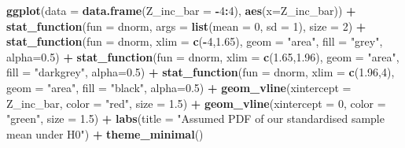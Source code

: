 \documentclass[]{article}
\newenvironment{Shaded}{\begin{snugshade}}{\end{snugshade}}
\newcommand{\KeywordTok}[1]{\textcolor[rgb]{0.13,0.29,0.53}{\textbf{#1}}}
\newcommand{\DataTypeTok}[1]{\textcolor[rgb]{0.13,0.29,0.53}{#1}}
\newcommand{\DecValTok}[1]{\textcolor[rgb]{0.00,0.00,0.81}{#1}}
\newcommand{\FloatTok}[1]{\textcolor[rgb]{0.00,0.00,0.81}{#1}}
\newcommand{\StringTok}[1]{\textcolor[rgb]{0.31,0.60,0.02}{#1}}
\newcommand{\OperatorTok}[1]{\textcolor[rgb]{0.81,0.36,0.00}{\textbf{#1}}}
\newcommand{\NormalTok}[1]{#1}
\begin{document}
\begin{Shaded}
\begin{Highlighting}[]
\KeywordTok{ggplot}\NormalTok{(}\DataTypeTok{data =}  \KeywordTok{data.frame}\NormalTok{(}\DataTypeTok{Z_inc_bar =} \OperatorTok{-}\DecValTok{4}\OperatorTok{:}\DecValTok{4}\NormalTok{), }\KeywordTok{aes}\NormalTok{(}\DataTypeTok{x=}\NormalTok{Z_inc_bar)) }\OperatorTok{+}
\StringTok{  }\KeywordTok{stat_function}\NormalTok{(}\DataTypeTok{fun =}\NormalTok{ dnorm, }\DataTypeTok{args =} \KeywordTok{list}\NormalTok{(}\DataTypeTok{mean =} \DecValTok{0}\NormalTok{, }\DataTypeTok{sd =} \DecValTok{1}\NormalTok{), }\DataTypeTok{size =} \DecValTok{2}\NormalTok{) }\OperatorTok{+}
\StringTok{    }\KeywordTok{stat_function}\NormalTok{(}\DataTypeTok{fun =}\NormalTok{ dnorm, }\DataTypeTok{xlim =} \KeywordTok{c}\NormalTok{(}\OperatorTok{-}\DecValTok{4}\NormalTok{,}\FloatTok{1.65}\NormalTok{), }\DataTypeTok{geom =} \StringTok{"area"}\NormalTok{, }\DataTypeTok{fill =} \StringTok{"grey"}\NormalTok{, }\DataTypeTok{alpha=}\FloatTok{0.5}\NormalTok{) }\OperatorTok{+}
\StringTok{  }\KeywordTok{stat_function}\NormalTok{(}\DataTypeTok{fun =}\NormalTok{ dnorm, }\DataTypeTok{xlim =} \KeywordTok{c}\NormalTok{(}\FloatTok{1.65}\NormalTok{,}\FloatTok{1.96}\NormalTok{), }\DataTypeTok{geom =} \StringTok{"area"}\NormalTok{, }\DataTypeTok{fill =} \StringTok{"darkgrey"}\NormalTok{, }\DataTypeTok{alpha=}\FloatTok{0.5}\NormalTok{) }\OperatorTok{+}
\StringTok{  }\KeywordTok{stat_function}\NormalTok{(}\DataTypeTok{fun =}\NormalTok{ dnorm, }\DataTypeTok{xlim =} \KeywordTok{c}\NormalTok{(}\FloatTok{1.96}\NormalTok{,}\DecValTok{4}\NormalTok{), }\DataTypeTok{geom =} \StringTok{"area"}\NormalTok{, }\DataTypeTok{fill =} \StringTok{"black"}\NormalTok{, }\DataTypeTok{alpha=}\FloatTok{0.5}\NormalTok{) }\OperatorTok{+}
\StringTok{  }\KeywordTok{geom_vline}\NormalTok{(}\DataTypeTok{xintercept =}\NormalTok{ Z_inc_bar, }\DataTypeTok{color =} \StringTok{"red"}\NormalTok{, }\DataTypeTok{size =} \FloatTok{1.5}\NormalTok{) }\OperatorTok{+}
\StringTok{  }\KeywordTok{geom_vline}\NormalTok{(}\DataTypeTok{xintercept =} \DecValTok{0}\NormalTok{, }\DataTypeTok{color =} \StringTok{"green"}\NormalTok{, }\DataTypeTok{size =} \FloatTok{1.5}\NormalTok{) }\OperatorTok{+}
\StringTok{  }\KeywordTok{labs}\NormalTok{(}\DataTypeTok{title =} \StringTok{"Assumed PDF of our standardised sample mean under H0"}\NormalTok{) }\OperatorTok{+}
\StringTok{  }\KeywordTok{theme_minimal}\NormalTok{()}
\end{Highlighting}
\end{Shaded}
\end{document}
